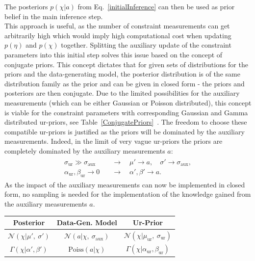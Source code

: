 \noindent The posteriors $p(\chi \vert a)$ from Eq.~\eqref{initialInference} can then be used as prior belief in the main inference step. \\
This approach is useful, as the number of constraint measurements can get arbitrarily high which would imply high computational cost when updating $p(\eta)$ and $p(\chi)$ together. Splitting the auxiliary update of the constraint parameters into this initial step solves this issue based on the concept of conjugate priors. This concept dictates that for given sets of distributions for the priors and the data-generating model, the posterior distribution is of the same distribution family as the prior and can be given in closed form - the priors and posteriors are then conjugate. Due to the limited possibilities for the auxiliary measurements (which can be either Gaussian or Poisson distributed), this concept is viable for the constraint parameters with corresponding Gaussian and Gamma distributed ur-priors, see Table~\ref{ConjugatePriors}~\cite{ConjPriorsBerkeley}. The freedom to choose these compatible ur-priors is justified as the priors will be dominated by the auxiliary measurements. Indeed, in the limit of very vague ur-priors the priors are completely dominated by the auxiliary measurements $a$:
    \begin{align}
    \begin{split}
        \sigma_{\text{ur}} \gg \sigma_{\text{aux}} \quad &\longrightarrow \quad  \mu' \rightarrow a, \quad \sigma' \rightarrow \sigma_{\text{aux}}, \\
        \alpha_{\text{ur}}, \beta_{\text{ur}} \rightarrow 0 \quad &\longrightarrow \quad \alpha', \beta' \rightarrow a.
    \end{split}
    \end{align}
As the impact of the auxiliary measurements can now be implemented in closed form, no sampling is needed for the implementation of the knowledge gained from the auxiliary measurements $a$.

    \begin{center}
        \begin{tabular}
        {| c || c | c|}
         \hline
          Posterior & Data-Gen. Model & Ur-Prior \\
         \hline
         \hline
         $\mathcal{N}\left( \chi | \mu',~\sigma'\right)$ &$ \mathcal{N}\left( a | \chi,~\sigma_{\text{aux}}\right)$ & $\mathcal{N}\left( \chi | \mu_{\text{ur}},~\sigma_{\text{ur}}\right)$ \\
        \hline
        $\Gamma\left(\chi |\alpha', \beta'\right)$ & $\text{Poiss}\left( a | \chi \right)$ & $\Gamma\left(\chi |\alpha_{\text{ur}}, \beta_{\text{ur}} \right)$ \\
        \hline
        \end{tabular}
    \end{center}


